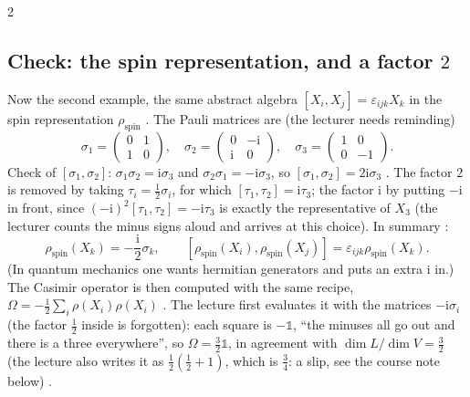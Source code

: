 \begin{paracol}{2}
\subsection{Check: the spin representation, and a factor $2$}\label{sec:rp-casimir-spin}
Now the second example, the same abstract algebra $[X_i,X_j]=\varepsilon_{ijk}X_k$ in the spin representation $\rho_{\mathrm{spin}}$ . The Pauli matrices are (the lecturer needs reminding)
\[
  \sigma_1=\begin{pmatrix}0&1\\1&0\end{pmatrix},\quad\sigma_2=\begin{pmatrix}0&-\mathrm i\\\mathrm i&0\end{pmatrix},\quad\sigma_3=\begin{pmatrix}1&0\\0&-1\end{pmatrix}.
\]
Check of $[\sigma_1,\sigma_2]$: $\sigma_1\sigma_2=\mathrm i\sigma_3$ and $\sigma_2\sigma_1=-\mathrm i\sigma_3$, so $[\sigma_1,\sigma_2]=2\mathrm i\sigma_3$    . The factor $2$ is removed by taking $\tau_i=\frac12\sigma_i$, for which $[\tau_1,\tau_2]=\mathrm i\tau_3$; the factor $\mathrm i$ by putting $-\mathrm i$ in front, since $(-\mathrm i)^2[\tau_1,\tau_2]=-\mathrm i\tau_3$ is exactly the representative of $X_3$ (the lecturer counts the minus signs aloud and arrives at this choice). In summary      :
\[
  \rho_{\mathrm{spin}}(X_k)=-\frac{\mathrm i}{2}\sigma_k,\qquad[\rho_{\mathrm{spin}}(X_i),\rho_{\mathrm{spin}}(X_j)]=\varepsilon_{ijk}\rho_{\mathrm{spin}}(X_k).
\]
(In quantum mechanics one wants hermitian generators and puts an extra $\mathrm i$ in.) The Casimir operator is then computed with the same recipe, $\Omega=-\frac12\sum_i\rho(X_i)\rho(X_i)$  . The lecture first evaluates it with the matrices $-\mathrm i\sigma_i$ (the factor $\frac12$ inside is forgotten): each square is $-\mathbb 1$, ``the minuses all go out and there is a three everywhere'', so $\Omega=\frac32\mathbb 1$, in agreement with $\dim L/\dim V=\frac32$ (the lecture also writes it as $\frac12(\frac12+1)$, which is $\frac34$: a slip, see the course note below)     .


\end{paracol}
